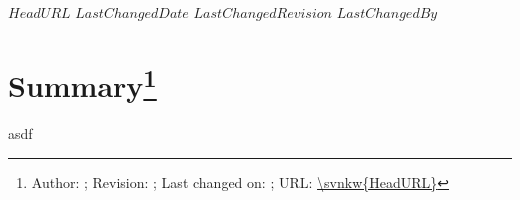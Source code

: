 \svnidlong
{$HeadURL$}
{$LastChangedDate$}
{$LastChangedRevision$}
{$LastChangedBy$}

\section{Summary\footnote{Author: \svnauthor; Revision: \svnrev; Last changed on: \svndate; URL: \url{\svnkw{HeadURL}}}}

asdf
